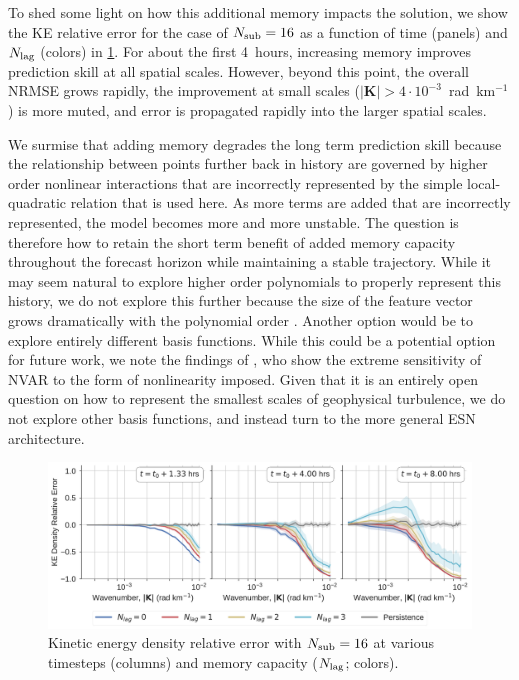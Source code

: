 To shed some light on how this additional memory impacts the solution,
we show the KE relative error
for the case of $N_\text{sub}=16$ as a function of time (panels) and $N_\text{lag}$ (colors)
in \cref{fig:nvar_ke_vs_lag}.
For about the first 4~hours, increasing memory improves prediction skill at all
spatial scales.
However, beyond this point, the overall NRMSE grows rapidly, the improvement
at small scales ($|\mathbf{K}|>4\cdot10^{-3}$~rad~km$^{-1}$) is more muted,
and error is propagated rapidly into the larger spatial scales.

We surmise that adding memory degrades the long term prediction skill because
the relationship between points further back in history are governed by higher
order nonlinear interactions that are incorrectly represented by
the simple local-quadratic relation that is used here.
As more terms are added that are incorrectly represented, the model becomes
more and more unstable.
The question is therefore how to retain the short term benefit of added memory
capacity throughout the forecast horizon while maintaining a stable trajectory.
While it may seem natural to explore higher order polynomials to
properly represent this history, we do not explore this further because the size
of the feature vector grows dramatically with the polynomial order
\citep{chen_next_2022}.
Another option would be to explore entirely different basis functions.
While this could be a potential option for future work, we note the findings of
\citet{zhang_catch-22_2022}, who show the extreme sensitivity of NVAR to the
form of nonlinearity imposed.
Given that it is an entirely open question on how to represent the smallest
scales of geophysical turbulence, we do not explore other basis functions, and
instead turn to the more general ESN architecture.

\begin{figure}
    \centering
    \includegraphics[width=\textwidth]{../figures/nvar_ke_relerr_vs_lag.pdf}
    \caption{Kinetic energy density relative error with $N_\text{sub}=16$ at various
        timesteps (columns) and memory capacity ($N_\text{lag}$; colors).
    }
    \label{fig:nvar_ke_vs_lag}
\end{figure}
